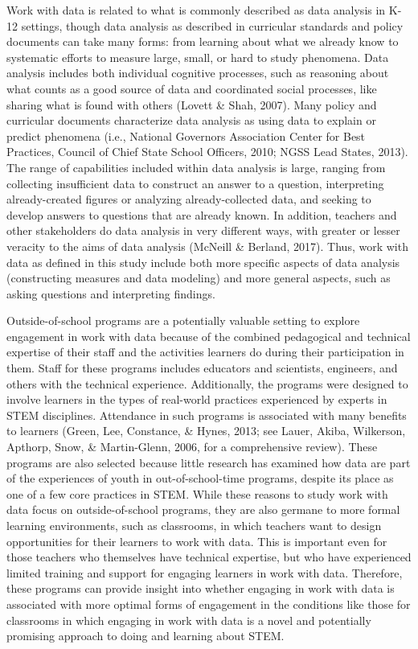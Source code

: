 \documentclass[]{msu-thesis}
\theoremstyle{definition}
\theoremstyle{definition}
\theoremstyle{definition}
\theoremstyle{remark}
\begin{document}
Work with data is related to what is commonly described as data analysis
in K-12 settings, though data analysis as described in curricular
standards and policy documents can take many forms: from learning about
what we already know to systematic efforts to measure large, small, or
hard to study phenomena. Data analysis includes both individual
cognitive processes, such as reasoning about what counts as a good
source of data and coordinated social processes, like sharing what is
found with others (Lovett \& Shah, 2007). Many policy and curricular
documents characterize data analysis as using data to explain or predict
phenomena (i.e., National Governors Association Center for Best
Practices, Council of Chief State School Officers, 2010; NGSS Lead
States, 2013). The range of capabilities included within data analysis
is large, ranging from collecting insufficient data to construct an
answer to a question, interpreting already-created figures or analyzing
already-collected data, and seeking to develop answers to questions that
are already known. In addition, teachers and other stakeholders do data
analysis in very different ways, with greater or lesser veracity to the
aims of data analysis (McNeill \& Berland, 2017). Thus, work with data
as defined in this study include both more specific aspects of data
analysis (constructing measures and data modeling) and more general
aspects, such as asking questions and interpreting findings.

Outside-of-school programs are a potentially valuable setting to explore
engagement in work with data because of the combined pedagogical and
technical expertise of their staff and the activities learners do during
their participation in them. Staff for these programs includes educators
and scientists, engineers, and others with the technical experience.
Additionally, the programs were designed to involve learners in the
types of real-world practices experienced by experts in STEM
disciplines. Attendance in such programs is associated with many
benefits to learners (Green, Lee, Constance, \& Hynes, 2013; see Lauer,
Akiba, Wilkerson, Apthorp, Snow, \& Martin-Glenn, 2006, for a
comprehensive review). These programs are also selected because little
research has examined how data are part of the experiences of youth in
out-of-school-time programs, despite its place as one of a few core
practices in STEM. While these reasons to study work with data focus on
outside-of-school programs, they are also germane to more formal
learning environments, such as classrooms, in which teachers want to
design opportunities for their learners to work with data. This is
important even for those teachers who themselves have technical
expertise, but who have experienced limited training and support for
engaging learners in work with data. Therefore, these programs can
provide insight into whether engaging in work with data is associated
with more optimal forms of engagement in the conditions like those for
classrooms in which engaging in work with data is a novel and
potentially promising approach to doing and learning about STEM.
\end{document}
